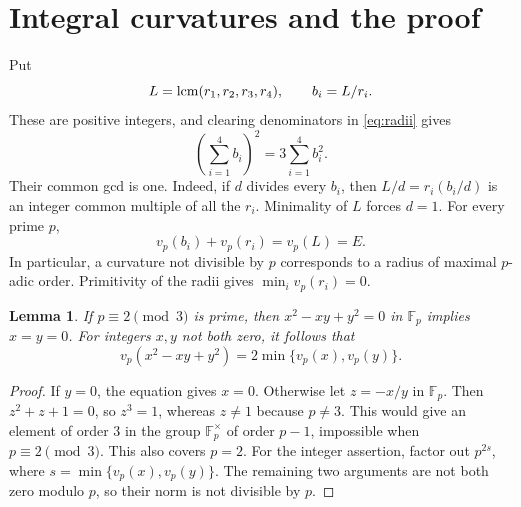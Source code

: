 \documentclass[11pt]{article}
\newtheorem{lemma}[theorem]{Lemma}
\begin{document}
\section{Integral curvatures and the proof}
Put
\begin{equation}\label{eq:curvatures}
 L=\mathop{\rm lcm}(r_1,r_2,r_3,r_4),\qquad b_i=L/r_i.
\end{equation}
These are positive integers, and clearing denominators in
\eqref{eq:radii} gives
\begin{equation}\label{eq:integral}
 \left(\sum_{i=1}^4 b_i\right)^2=3\sum_{i=1}^4 b_i^2.
\end{equation}
Their common gcd is one. Indeed, if $d$ divides every $b_i$, then
$L/d=r_i(b_i/d)$ is an integer common multiple of all the $r_i$.
Minimality of $L$ forces $d=1$. For every prime $p$,
\begin{equation}\label{eq:orders}
 v_p(b_i)+v_p(r_i)=v_p(L)=E.
\end{equation}
In particular, a curvature not divisible by $p$ corresponds to a radius of
maximal $p$-adic order. Primitivity of the radii gives
$\min_i v_p(r_i)=0$.

\begin{lemma}\label{lem:norm}
If $p\equiv2\pmod3$ is prime, then
$x^2-xy+y^2=0$ in $\mathbb F_p$ implies $x=y=0$.
For integers $x,y$ not both zero, it follows that
\[
 v_p(x^2-xy+y^2)=2\min\{v_p(x),v_p(y)\}.
\]
\end{lemma}
\begin{proof}
If $y=0$, the equation gives $x=0$. Otherwise let $z=-x/y$ in
$\mathbb F_p$. Then $z^2+z+1=0$, so $z^3=1$, whereas $z\ne1$
because $p\ne3$. This would give an element of order $3$ in the group
$\mathbb F_p^\times$ of order $p-1$, impossible when $p\equiv2\pmod3$.
This also covers $p=2$. For the integer assertion, factor out
$p^{2s}$, where $s=\min\{v_p(x),v_p(y)\}$. The remaining two arguments
are not both zero modulo $p$, so their norm is not divisible by $p$.
\end{proof}
\end{document}
